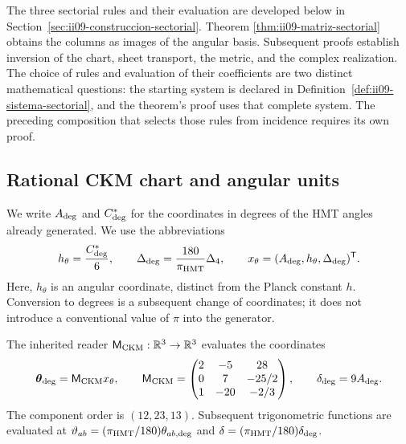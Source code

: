 \begin{remark}
The three sectorial rules and their evaluation are developed below
in Section~\ref{sec:ii09-construccion-sectorial}. Theorem
\ref{thm:ii09-matriz-sectorial} obtains the columns as images of the
angular basis. Subsequent proofs establish inversion of the chart,
sheet transport, the metric, and the complex realization.
The choice of rules and evaluation of their coefficients are two
distinct mathematical questions: the starting system is declared in
Definition~\ref{def:ii09-sistema-sectorial}, and the theorem's proof
uses that complete system. The preceding composition that selects those
rules from incidence requires its own proof.
\end{remark}



\subsection{Rational CKM chart and angular units}

We write \(A_{\rm deg}\) and \(C^*_{\rm deg}\) for the coordinates in
degrees of the HMT angles already generated. We use the abbreviations
\begin{equation}
 h_\theta=\frac{C^*_{\rm deg}}6,
 \qquad
 \Delta_{\rm deg}=\frac{180}{\pi_{\rm HMT}}\Delta_4,
 \qquad
 x_\theta=(A_{\rm deg},h_\theta,\Delta_{\rm deg})^{\mathsf T}.
 \label{eq:ii-angular-chart}
\end{equation}
Here, \(h_\theta\) is an angular coordinate, distinct from the Planck
constant \(h\). Conversion to degrees is a subsequent change of coordinates; it
does not introduce a conventional value of \(\pi\) into the generator.

\begin{definition}
The inherited reader \(\mathsf M_{\rm CKM}:\mathbb R^3\to\mathbb R^3\)
evaluates the coordinates
\begin{equation}
 \boldsymbol\theta_{\rm deg}=\mathsf M_{\rm CKM}x_\theta,
 \qquad
 \mathsf M_{\rm CKM}=
 \begin{pmatrix}
 2&-5&28\\
 0&7&-25/2\\
 1&-20&-2/3
 \end{pmatrix},
 \qquad
 \delta_{\rm deg}=9A_{\rm deg}.
 \label{eq:ii-ckm-map}
\end{equation}
The component order is \((12,23,13)\). Subsequent trigonometric
functions are evaluated at
\(\vartheta_{ab}=(\pi_{\rm HMT}/180)\theta_{ab,\rm deg}\) and
\(\delta=(\pi_{\rm HMT}/180)\delta_{\rm deg}\).
\end{definition}

